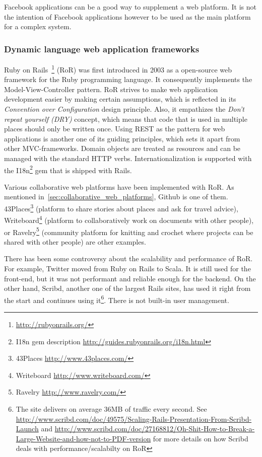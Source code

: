 Facebook applications can be a good way to supplement a web platform. It is not the intention of Facebook applications however to be used as the main platform for a complex system.

\subsubsection{Dynamic language web application frameworks}
Ruby on Rails~\footnote{\url{http://rubyonrails.org/}} (RoR) was first introduced in 2003 as a open-source web framework for the Ruby programming language. It consequently implements the Model-View-Controller pattern. 
RoR strives to make web application development easier by making certain assumptions, which is reflected in its \textit{Convention over Configuration} design principle. Also, it empathizes the \textit{Don't repeat yourself (DRY)} concept, which means that code that is used in multiple places should only be written once. 
Using REST as the pattern for web applications is another one of its guiding principles, which sets it apart from other MVC-frameworks. Domain objects are treated as resources and can be managed with the standard HTTP verbs. Internationalization is supported with the I18n\footnote{I18n gem description \url{http://guides.rubyonrails.org/i18n.html}} gem that is shipped with Rails.

Various collaborative web platforms have been implemented with RoR. As mentioned in~\ref{sec:collaborative_web_platforms}, Github is one of them. 43Places\footnote{43Places \url{http://www.43places.com/}} (platform to share stories about places and ask for travel advice), Writeboard\footnote{Writeboard \url{http://www.writeboard.com/}} (platform to collaboratively work on documents with other people), or Ravelry\footnote{Ravelry \url{http://www.ravelry.com/}} (community platform for knitting and crochet where projects can be shared with other people) are other examples.

There has been some controversy about the scalability and performance of RoR. For example, Twitter moved from Ruby on Rails to Scala. It is still used for the front-end, but it was not performant and reliable enough for the backend\cite{twitter_ruby_scala}. On the other hand, Scribd, another one of the largest Rails sites, has used it right from the start and continues using it\footnote{The site delivers on average 36MB of traffic every second. See \url{http://www.scribd.com/doc/49575/Scaling-Rails-Presentation-From-Scribd-Launch} and \url{http://www.scribd.com/doc/27168812/Oh-Shit-How-to-Break-a-Large-Website-and-how-not-to-PDF-version} for more details on how Scribd deals with performance/scalabilty on RoR}.
There is not built-in user management.

